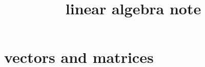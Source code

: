 \documentclass{article}
\title{linear algebra note}
\author{}
\date{}
\begin{document}
\maketitle
\section{vectors and matrices}
\end{document}
